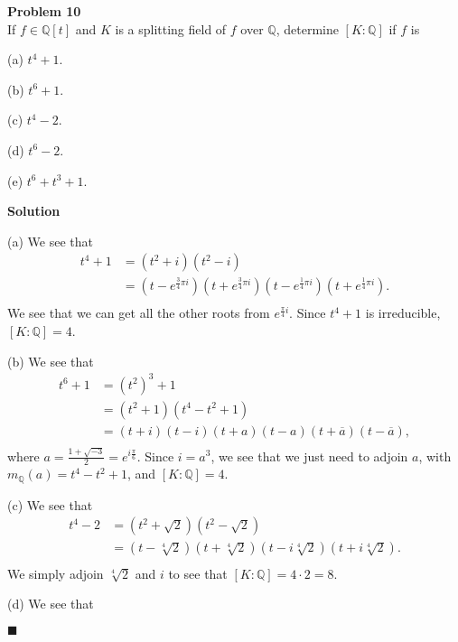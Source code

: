 \documentclass{article}
\theoremstyle{definition}
\newenvironment{problem}[2][Problem]
    { \begin{mdframed}[backgroundcolor=gray!20] \textbf{#1 #2} \\}
    {  \end{mdframed}}
\newenvironment{solution}{\textbf{Solution}}{%
     \hfill$\blacksquare$\par\medskip}
\begin{document}
    \begin{problem}{10}
    
    
    If $f \in \mathds{Q}\left[ t \right]$ and $K$ is a splitting field of $f$ over $\mathds{Q}$, determine $\left[ K : \mathds{Q} \right]$ if $f$ is 

    (a) $t^{4} + 1$.

    (b) $t^{6} + 1$.

    (c) $t^{4} - 2$. 

    (d) $t^{6} - 2$.

    (e) $t^{6} + t^{3} + 1$.
    
    \end{problem}
    
    \begin{solution}
    
    (a) We see that 
    \begin{align*}
        t^{4} + 1 &= \left( t^{2} + i \right)\left( t^{2}-i \right) \\
        &= \left( t- e^{\frac{3}{4}\pi i} \right) \left( t+e^{\frac{3}{4}\pi i} \right) \left( t - e^{\frac{1}{4} \pi i} \right) \left( t + e^{\frac{1}{4} \pi i} \right). \\
    \end{align*}
    We see that we can get all the other roots from $e^{\frac{\pi}{4}i}$. Since $t^{4} + 1$ is irreducible, $\left[ K : \mathds{Q} \right] = 4$.

    (b) We see that 
    \begin{align*}
        t^{6} + 1 &= \left( t^{2} \right)^{3} + 1  \\
        &= \left( t^{2} + 1 \right)\left( t^{4} -t^{2} + 1 \right) \\
        &= \left( t + i \right)\left( t-i \right) \left( t + a \right)\left( t-a \right) \left( t+\overline{a} \right)\left( t-\overline{a} \right), \\
    \end{align*}
    where $a = \frac{1 + \sqrt{-3} }{2} = e^{i \frac{\pi}{6}}$. Since $i = a^{3}$, we see that we just need to adjoin $a$, with $m_{\mathds{Q}}\left( a \right) = t^{4} - t^{2} + 1$, and $\left[ K : \mathds{Q} \right] = 4$.

    (c) We see that 
    \begin{align*}
        t^{4} - 2 &= \left( t^{2} + \sqrt{2}  \right)\left( t^{2} - \sqrt{2}  \right) \\
        &= \left( t-\sqrt[4]{2}  \right)\left( t + \sqrt[4]{2}  \right)\left( t- i \sqrt[4]{2}  \right)\left( t + i\sqrt[4]{2}  \right). \\
    \end{align*}
    We simply adjoin $\sqrt[4]{2} $ and $i$ to see that $\left[ K : \mathds{Q} \right] = 4 \cdot 2 = 8$.

    (d) We see that 
    
    
    \end{solution}
    
\end{document}
